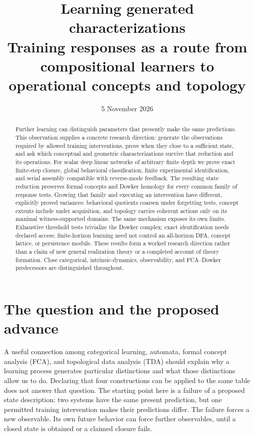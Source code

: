 \documentclass[11pt]{article}
\title{Learning generated characterizations\\
\large Training responses as a route from compositional learners to operational concepts and topology}
\author{}\date{5 November 2026}
\theoremstyle{definition}\newtheorem{definition}[theorem]{Definition}
\theoremstyle{remark}\newtheorem{remark}[theorem]{Remark}
\begin{document}
\maketitle
\begin{abstract}
Further learning can distinguish parameters that presently make the same
predictions. This observation supplies a concrete research direction:
generate the observations required by allowed training interventions, prove
when they close to a sufficient state, and ask which conceptual and
geometric characterizations survive that reduction and its operations.
For scalar deep linear networks of arbitrary finite depth we prove exact
finite-step closure, global behavioral classification, finite experimental
identification, and serial assembly compatible with reverse-mode feedback.
The resulting state reduction preserves formal concepts and Dowker homology
for every common family of response tests. Growing that family and executing
an intervention have different, explicitly proved variances: behavioral
quotients coarsen under forgetting tests, concept extents include under
acquisition, and topology carries coherent actions only on its maximal
witness-supported domains. The same mechanism exposes its own limits.
Exhaustive threshold tests trivialize the Dowker complex; exact identification
needs declared access; finite-horizon learning need not control an all-horizon
DFA, concept lattice, or persistence module. These results form a worked
research direction rather than a claim of new general realization theory or
a completed account of theory formation. Close categorical, intrinsic-dynamics,
observability, and FCA--Dowker predecessors are distinguished throughout.
\end{abstract}

\section{The question and the proposed advance}
A useful connection among categorical learning, automata, formal concept
analysis (FCA), and topological data analysis (TDA) should explain why a
learning process generates particular distinctions and what those distinctions
allow us to do. Declaring that four constructions can be applied to the same
table does not answer that question. The starting point here is a failure of
a proposed state description: two systems have the same present prediction,
but one permitted training intervention makes their predictions differ.
The failure forces a new observable. Its own future behavior can force further
observables, until a closed state is obtained or a claimed closure fails.
\end{document}
